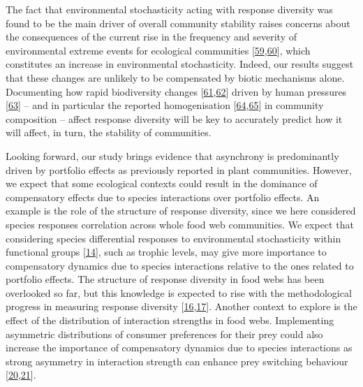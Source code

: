 \documentclass[
]{article}
\begin{document}
The fact that environmental stochasticity acting with response diversity was
found to be the main driver of overall community stability raises concerns
about the consequences of the current rise in the frequency and severity of
environmental extreme events for ecological communities
{[}\protect\hyperlink{ref-ghosh_temperature_2024}{59},\protect\hyperlink{ref-lee_ipcc_2023}{60}{]}, which constitutes an increase in
environmental stochasticity. Indeed, our results suggest that these changes are
unlikely to be compensated by biotic mechanisms alone. Documenting how rapid
biodiversity changes {[}\protect\hyperlink{ref-dornelas_assemblage_2014}{61},\protect\hyperlink{ref-blowes_geography_2019}{62}{]} driven
by human pressures {[}\protect\hyperlink{ref-danet_past_2024}{63}{]} -- and in particular the reported
homogenisation {[}\protect\hyperlink{ref-olden_homogocene_2018}{64},\protect\hyperlink{ref-wang_biotic_2021}{65}{]} in community
composition -- affect response diversity will be key to accurately predict how
it will affect, in turn, the stability of communities.

Looking forward, our study brings evidence that asynchrony is predominantly
driven by portfolio effects as previously reported in plant communities.
However, we expect that some ecological contexts could result in the dominance
of compensatory effects due to species interactions over portfolio effects. An
example is the role of the structure of response diversity, since we here
considered species responses correlation across whole food web communities. We
expect that considering species differential responses to environmental
stochasticity within functional groups {[}\protect\hyperlink{ref-elmqvist_response_2003}{14}{]}, such as
trophic levels, may give more importance to compensatory dynamics due to
species interactions relative to the ones related to portfolio effects.
The structure of response diversity in food webs has been overlooked so far,
but this knowledge is expected to rise with the methodological progress in
measuring response diversity {[}\protect\hyperlink{ref-ross_how_2023}{16},\protect\hyperlink{ref-polazzo_measuring_2024}{17}{]}. Another
context to explore is the effect of the distribution of interaction strengths
in food webs. Implementing asymmetric distributions of consumer preferences for
their prey could also increase the importance of compensatory dynamics due to
species interactions as strong asymmetry in interaction strength can enhance
prey switching behaviour {[}\protect\hyperlink{ref-mccann_weak_1998}{20},\protect\hyperlink{ref-mccann_diversitystability_2000}{21}{]}.
\end{document}

